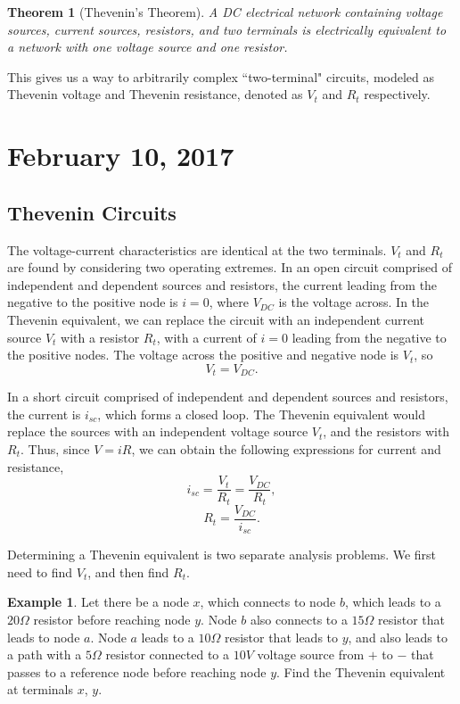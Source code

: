 \documentclass[11pt]{article}
\theoremstyle{plain} %
\newtheorem*{theorem}{Theorem}
\theoremstyle{definition}
\theoremstyle{example}
\newtheorem*{example}{Example}
\theoremstyle{remark}
\begin{document}
\begin{theorem}[Thevenin's Theorem]
A DC electrical network containing voltage sources, current sources, resistors, and two terminals is electrically equivalent to a network with one voltage source and one resistor. 
\end{theorem}
This gives us a way to arbitrarily complex ``two-terminal" circuits, modeled as Thevenin voltage and Thevenin resistance, denoted as $V_t$ and $R_t$ respectively.
 
 
\section{February 10, 2017}
\subsection{Thevenin Circuits}

The voltage-current characteristics are identical at the two terminals. $V_t$ and $R_t$ are found by considering two operating extremes. In an open circuit comprised of independent and dependent sources and resistors, the current leading from the negative to the positive node is $i=0$, where $V_{DC}$ is the voltage across. In the Thevenin equivalent, we can replace the circuit with an independent current source $V_t$ with a resistor $R_t$, with a current of $i=0$ leading from the negative to the positive nodes. The voltage across the positive and negative node is $V_t$, so 
$$V_t = V_{DC}.$$

In a short circuit comprised of independent and dependent sources and resistors, the current is $i_{sc}$, which forms a closed loop. The Thevenin equivalent would replace the sources with an independent voltage source $V_t$, and the resistors with $R_t$. Thus, since $ V=iR$, we can obtain the following expressions for current and resistance, $$i_{sc}  =\frac{V_t}{R_t} = \frac{V_{DC}}{R_t},$$
$$R_t = \frac{V_{DC}}{i_{sc}}.$$

Determining a Thevenin equivalent is two separate analysis problems. We first need to find $V_t$, and then find $R_t$. 

\begin{example}
Let there be a node $x$, which connects to node $b$, which leads to a $20\Omega$ resistor before reaching node $y$. Node $b$ also connects to a $15\Omega$ resistor that leads to node $a$. Node $a$ leads to a $10\Omega $ resistor that leads to $y$, and also leads to a path with a $5\Omega$ resistor connected to a $10V$ voltage source from $+$ to $-$ that passes to a reference node before reaching node $y$. Find the Thevenin equivalent at terminals $x$, $y$. 
\end{example}
\end{document}
